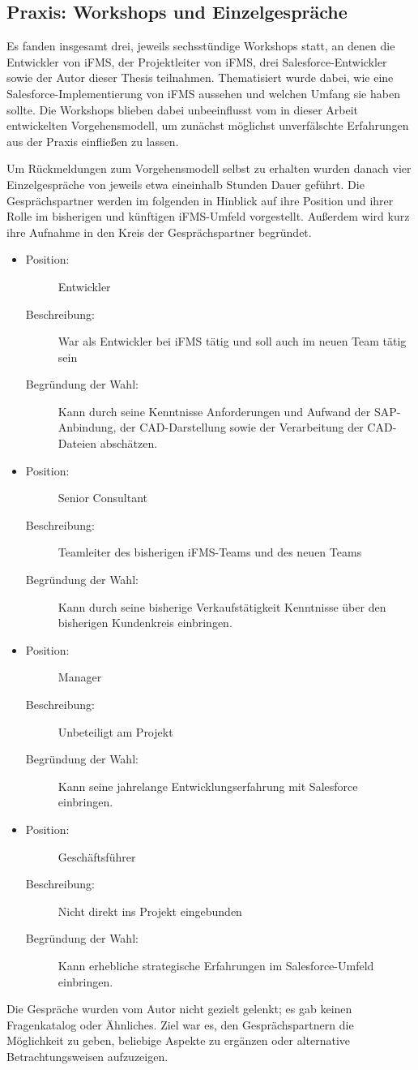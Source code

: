 \subsection{Praxis: Workshops und Einzelgespräche}
Es fanden insgesamt drei, jeweils sechsstündige Workshops statt, an denen die 
Entwickler von iFMS, der Projektleiter von iFMS, drei 
Salesforce-Entwickler sowie der Autor dieser Thesis teilnahmen. Thematisiert 
wurde dabei, wie eine Salesforce-Implementierung von iFMS aussehen und welchen 
Umfang sie haben sollte. Die Workshops blieben dabei unbeeinflusst vom in 
dieser Arbeit entwickelten Vorgehensmodell, um zunächst möglichst unverfälschte 
Erfahrungen aus der Praxis einfließen zu lassen.

Um Rückmeldungen zum Vorgehensmodell selbst zu erhalten wurden danach 
vier Einzelgespräche von jeweils etwa eineinhalb Stunden Dauer geführt. 
Die Gesprächspartner werden im folgenden in Hinblick auf ihre Position und 
ihrer Rolle im bisherigen und künftigen iFMS-Umfeld vorgestellt. Außerdem wird 
kurz ihre Aufnahme in den Kreis der Gesprächspartner begründet.

\newcommand{\person}[3]{\begin{description}
                        	\item[Position:] #1
				\item[Beschreibung:] #2
                        	\item[Begründung der Wahl:] #3
                        \end{description}
}
\begin{itemize}
\item \person{Entwickler}{War als Entwickler bei iFMS tätig und soll auch im 
neuen Team tätig sein}{Kann durch seine 
Kenntnisse Anforderungen und Aufwand der SAP-Anbindung, der CAD-Darstellung 
sowie der Verarbeitung der CAD-Dateien abschätzen.}
\item \person{Senior Consultant}{Teamleiter des bisherigen iFMS-Teams und des 
neuen Teams}{Kann durch seine bisherige Verkaufstätigkeit Kenntnisse über den 
 bisherigen Kundenkreis einbringen.}
\item \person{Manager}{Unbeteiligt am Projekt}{Kann seine jahrelange 
Entwicklungserfahrung mit Salesforce einbringen.}
\item \person{Geschäftsführer}{Nicht direkt ins Projekt eingebunden}{Kann 
erhebliche strategische Erfahrungen im Salesforce-Umfeld einbringen.}
\end{itemize}
Die Gespräche wurden vom Autor nicht gezielt gelenkt; es gab keinen 
Fragenkatalog oder Ähnliches. Ziel war es, den Gesprächspartnern die 
Möglichkeit zu geben, beliebige Aspekte zu ergänzen oder alternative 
Betrachtungsweisen aufzuzeigen.
\label{cha:praxis}